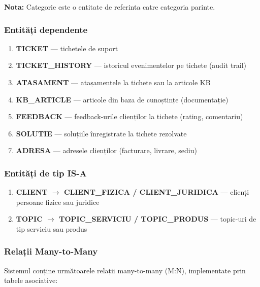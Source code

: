 \textbf{Nota:} Categorie este o entitate de referinta catre categoria parinte.

\subsubsection{Entități dependente}

\begin{enumerate}
    \item \textbf{TICKET} — tichetele de suport
    \item \textbf{TICKET\_HISTORY} — istoricul evenimentelor pe tichete (audit trail)
    \item \textbf{ATASAMENT} — atașamentele la tichete sau la articole KB
    \item \textbf{KB\_ARTICLE} — articole din baza de cunoștințe (documentație)
    \item \textbf{FEEDBACK} — feedback-urile clienților la tichete (rating, comentariu)
    \item \textbf{SOLUTIE} — soluțiile înregistrate la tichete rezolvate
    \item \textbf{ADRESA} — adresele clienților (facturare, livrare, sediu)
\end{enumerate}

\subsubsection{Entități de tip IS-A}

\begin{enumerate}
    \item \textbf{CLIENT $\rightarrow$ CLIENT\_FIZICA / CLIENT\_JURIDICA} — clienți persoane fizice sau juridice
    \item \textbf{TOPIC $\rightarrow$ TOPIC\_SERVICIU / TOPIC\_PRODUS} — topic-uri de tip serviciu sau produs
\end{enumerate}

\subsubsection{Relații Many-to-Many}

Sistemul conține următoarele relații many-to-many (M:N), implementate prin tabele asociative:

